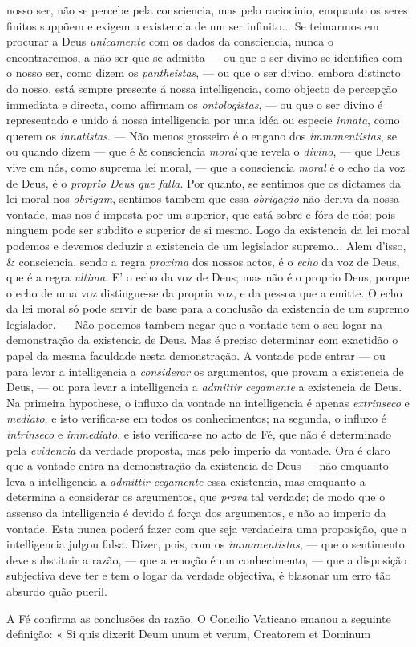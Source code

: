nosso ser, não se percebe pela consciencia, mas pelo raciocinio, emquanto os seres finitos suppõem e exigem a existencia de um ser infinito... Se teimarmos em procurar a Deus \emph{unicamente} com os dados da consciencia, nunca o encontraremos, a não ser que se admitta --- ou que o ser divino se identifica com o nosso ser, como dizem os \emph{pantheistas}, --- ou que o ser divino, embora distincto do nosso, está sempre presente á nossa intelligencia, como objecto de percepção immediata e directa, como affirmam os \emph{ontologistas}, --- ou que o ser divino é representado e unido á nossa intelligencia por uma idéa ou especie \emph{innata}, como querem os \emph{innatistas}. --- Não menos grosseiro é o engano dos \emph{immanentistas}, se ou quando dizem --- que é \& consciencia \emph{moral} que revela o \emph{divino}, --- que Deus vive em nós, como suprema lei moral, --- que a consciencia \emph{moral} é o echo da voz de Deus, é o \emph{proprio Deus que falla}. Por quanto, se sentimos que os dictames da lei moral nos \emph{obrigam}, sentimos tambem que essa \emph{obrigação} não deriva da nossa vontade, mas nos é imposta por um superior, que está sobre e fóra de nós; pois ninguem pode ser subdito e superior de si mesmo. Logo da existencia da lei moral podemos e devemos deduzir a existencia de um legislador supremo... Alem d'isso, \& consciencia, sendo a regra \emph{proxima} dos nossos actos, é o \emph{echo} da voz de Deus, que é a regra \emph{ultima}. E' o echo da voz de Deus; mas não é o proprio Deus; porque o echo de uma voz distingue-se da propria voz, e da pessoa que a emitte. O echo da lei moral só pode servir de base para a conclusão da existencia de um supremo legislador. --- Não podemos tambem negar que a vontade tem o seu logar na demonstração da existencia de Deus. Mas é preciso determinar com exactidão o papel da mesma faculdade nesta demonstração. A vontade pode entrar --- ou para levar a intelligencia a \emph{considerar} os argumentos, que provam a existencia de Deus, --- ou para levar a intelligencia a \emph{admittir cegamente} a existencia de Deus. Na primeira hypothese, o influxo da vontade na intelligencia é apenas \emph{extrinseco} e \emph{mediato}, e isto verifica-se em todos os conhecimentos; na segunda, o influxo é \emph{intrinseco} e \emph{immediato}, e isto verifica-se no acto de Fé, que não é determinado pela \emph{evidencia} da verdade proposta, mas pelo imperio da vontade. Ora é claro que a vontade entra na demonstração da existencia de Deus --- não emquanto leva a intelligencia a \emph{admittir cegamente} essa existencia, mas emquanto a determina a considerar os argumentos, que \emph{prova} tal verdade; de modo que o assenso da intelligencia é devido á força dos argumentos, e não ao imperio da vontade. Esta nunca poderá fazer com que seja verdadeira uma proposição, que a intelligencia julgou falsa. Dizer, pois, com os \emph{immanentistas}, --- que o sentimento deve substituir a razão, --- que a emoção é um conhecimento, --- que a disposição subjectiva deve ter e tem o logar da verdade objectiva, é blasonar um erro tão absurdo quão pueril.\par A Fé confirma as conclusões da razão. O Concilio Vaticano emanou a seguinte definição: « Si quis dixerit Deum unum et verum, Creatorem et Dominum 